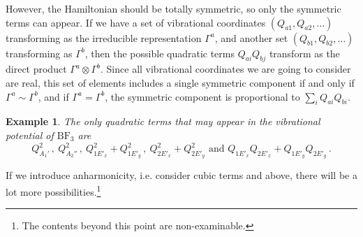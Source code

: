 \documentclass{article}
\theoremstyle{plain}\theoremheaderfont{\normalfont\itshape}\theorembodyfont{\rmfamily}\theoremseparator{.}\newtheorem*{rem}{Remark}\newtheorem*{ex}{Example}\newtheorem*{proof}{Proof}\newtheorem*{altp}{Alternative proof}
\theoremstyle{plain}\theoremheaderfont{\normalfont\bfseries}\theorembodyfont{\rmfamily}\theoremseparator{.}\newtheorem{thm}{Theorem}[section]\newtheorem{lem}[thm]{Lemma}\newtheorem{prop}[thm]{Proposition}\newtheorem*{cor}{Corollary}\newtheorem{defn}[thm]{Definition}\newtheorem{clm}[thm]{Claim}\newtheorem{clminproof}{Claim}\newtheorem*{law}{Law}\newtheorem{pos}[thm]{Postulate}
\theoremstyle{break}\theoremheaderfont{\normalfont\itshape}\theorembodyfont{\rmfamily}\theoremseparator{.\medskip}\newtheorem*{proofskip}{Proof}\newtheorem*{exs}{Examples}\newtheorem*{rems}{Remarks}
\theoremstyle{break}\theoremheaderfont{\normalfont\bfseries}\theorembodyfont{\rmfamily}\theoremseparator{.\medskip}\newtheorem{lemskip}[thm]{Lemma}\newtheorem{defnskip}[thm]{Definition}\newtheorem{propskip}[thm]{Proposition}\newtheorem{thmskip}[thm]{Theorem}
\numberwithin{equation}{section}
\begin{document}
    However, the Hamiltonian should be totally symmetric, so only the symmetric terms can appear. If we have a set of vibrational coordinates \((Q_{a1},Q_{a2},\dots)\) transforming as the irreducible representation \(\Gamma^a\), and another set \((Q_{b1},Q_{b2},\dots)\) transforming as \(\Gamma^b\), then the possible quadratic terms \(Q_{ai}Q_{bj}\) transform as the direct product \(\Gamma^a\otimes\Gamma^b\). Since all vibrational coordinates we are going to consider are real, this set of elements includes a single symmetric component if and only if \(\Gamma^a\sim\Gamma^b\), and if \(\Gamma^a=\Gamma^b\), the symmetric component is proportional to \(\sum_i Q_{ai}Q_{bi}\).

    \begin{ex}
        The only quadratic terms that may appear in the vibrational potential of \(\mathrm{BF_3}\) are
        \begin{equation}
            Q_{A_1'}^2\,,\ Q_{A_2''}^2\,,\ Q_{1E'_x}^2+Q_{1E'_y}^2\,,\ Q_{2E'_x}^2+Q_{2E'_y}^2\text{ and }Q_{1E'_x}Q_{2E'_x}+Q_{1E'_y}Q_{2E'_y}\,.
        \end{equation}
    \end{ex}

    If we introduce anharmonicity, i.e. consider cubic terms and above, there will be a lot more possibilities.\footnote{The contents beyond this point are non-examinable.}
\end{document}
